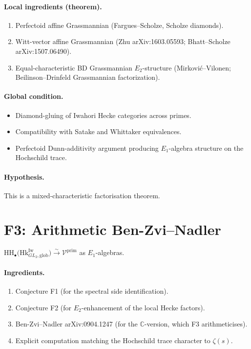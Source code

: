 \paragraph{Local ingredients (theorem).}
\begin{enumerate}
\item Perfectoid affine Grassmannian (Fargues--Scholze, Scholze
diamonds).
\item Witt-vector affine Grassmannian (Zhu arXiv:1603.05593;
Bhatt--Scholze arXiv:1507.06490).
\item Equal-characteristic BD Grassmannian \(E_{2}\)-structure
(Mirkovi\'c--Vilonen; Beilinson--Drinfeld Grassmannian factorization).
\end{enumerate}

\paragraph{Global condition.}
\begin{itemize}
\item Diamond-gluing of Iwahori Hecke categories across primes.
\item Compatibility with Satake and Whittaker equivalences.
\item Perfectoid Dunn-additivity argument producing \(E_{1}\)-algebra
structure on the Hochschild trace.
\end{itemize}

\paragraph{Hypothesis.} This is a mixed-characteristic factorisation theorem.

\section{F3: Arithmetic Ben-Zvi--Nadler}
\label{v4-arith:app:C:F3-details}

\begin{conjecture}[restatement of F3]
\label{v4-arith:app:C:F3-restatement}
\(\mathrm{HH}_{\bullet}\bigl(\mathrm{Hk}^{\mathrm{Iw}}_{GL_{2},\mathrm{glob}}\bigr)\xrightarrow{\sim}\mathcal{V}^{\mathrm{prim}}\)
as \(E_{1}\)-algebras.
\end{conjecture}

\paragraph{Ingredients.}
\begin{enumerate}
\item Conjecture F1 (for the spectral side identification).
\item Conjecture F2 (for \(E_{2}\)-enhancement of the local Hecke
factors).
\item Ben-Zvi--Nadler arXiv:0904.1247 (for the \(\mathbb{C}\)-version,
which F3 arithmeticises).
\item Explicit computation matching the Hochschild trace character
to \(\zeta(s)\).
\end{enumerate}

